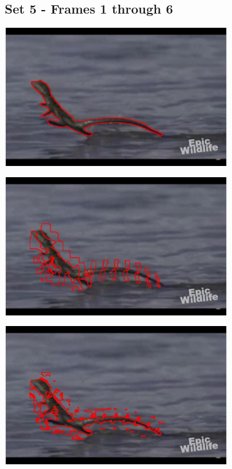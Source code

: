 \documentclass{article}
\begin{document}
	\subsection{Set 5 - Frames 1 through 6}
	
	\begin{center}
		\includegraphics[width=100mm]{img/e1}
	\end{center}
	
	\begin{center}
		\includegraphics[width=100mm]{img/e2}
	\end{center}
	
	\begin{center}
		\includegraphics[width=100mm]{img/e3}
	\end{center}
	
\end{document}
